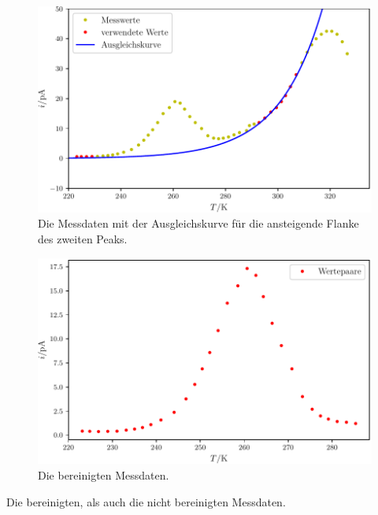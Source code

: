 \begin{figure}
	\centering
	\includegraphics[width=\linewidth-60pt,height=\textheight-60pt,keepaspectratio]{content/images/plot1exp.pdf}
	\caption{Die Messdaten mit der Ausgleichskurve für die ansteigende Flanke des zweiten Peaks.}
	\label{fig:plot1exp}
\end{figure}

\begin{figure}
	\centering
	\includegraphics[width=\linewidth-60pt,height=\textheight-60pt,keepaspectratio]{content/images/bereinigt1.pdf}
	\caption{Die bereinigten Messdaten.}
	\label{fig:bereinigt1}
\end{figure}

\begin{table}
\caption{Die bereinigten, als auch die nicht bereinigten Messdaten.}
\begin{minipage}[t]{0.5\textwidth}
	\centering
	
\end{minipage}
\begin{minipage}[t]{0.65\textwidth}
	\centering
	
\end{minipage}
\label{tab:data1}
\end{table}

